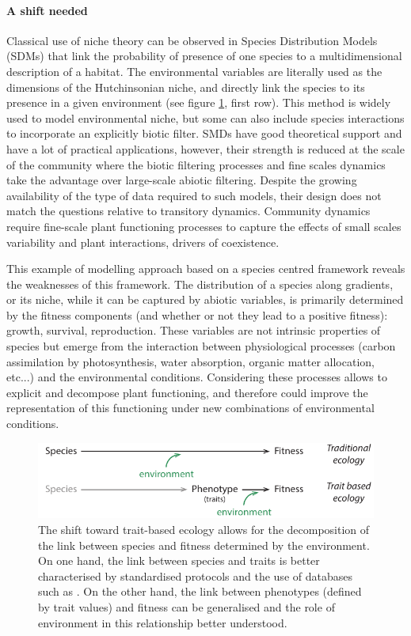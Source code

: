 \paragraph{A shift needed}

Classical use of niche theory can be observed in Species Distribution Models (SDMs) that link the probability of presence of one species to a multidimensional description of a habitat. The environmental variables are literally used as the dimensions of the Hutchinsonian niche, and directly link the species to its presence in a given environment (see figure \ref{fig:paradigm_shift}, first row). This method is widely used to model environmental niche, but some can also include species interactions to incorporate an explicitly biotic filter. SMDs have good theoretical support and have a lot of practical applications, however, their strength is reduced at the scale of the community where the biotic filtering processes and fine scales dynamics take the advantage over large-scale abiotic filtering. Despite the growing availability of the type of data required to such models, their design does not match the questions relative to transitory dynamics. Community dynamics require fine-scale plant functioning processes to capture the effects of small scales variability and plant interactions, drivers of coexistence. 

This example of modelling approach based on a species centred framework reveals the weaknesses of this framework. The distribution of a species along gradients, or its niche, while it can be captured by abiotic variables, is primarily determined by the fitness components (and whether or not they lead to a positive fitness): growth, survival, reproduction. These variables are not intrinsic properties of species but emerge from the interaction between physiological processes (carbon assimilation by photosynthesis, water absorption, organic matter allocation, etc...) and the environmental conditions. Considering these processes allows to explicit and decompose plant functioning, and therefore could improve the representation of this functioning under new combinations of environmental conditions.

\begin{figure}
    \includegraphics[width=1\linewidth]{./2_PP/Figures/Concepts/species_to_fitness.pdf}
  \caption[From discrete to continuous link between species and fitness]{The shift toward trait-based ecology allows for the decomposition of the link between species and fitness determined by the environment. On one hand, the link between species and traits is better characterised by standardised protocols and the use of databases such as \citet{kattge_try_2011}. On the other hand, the link between phenotypes (defined by trait values) and fitness can be generalised and the role of environment in this relationship better understood.}
  \label{fig:paradigm_shift}
\end{figure}

